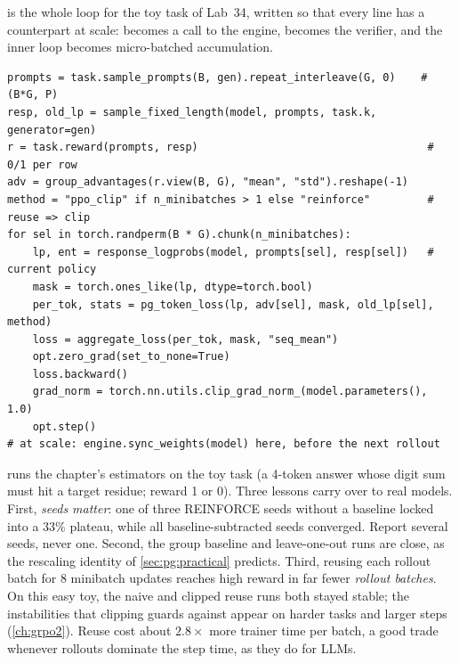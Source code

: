  is the whole loop for the toy task of Lab~34, written so that every line
has a counterpart at scale:  becomes a call to the engine,
 becomes the verifier, and the inner loop becomes micro-batched
accumulation.

\begin{lstlisting}[caption={One on-policy step with optional off-policy reuse (abridged from \code{llmsys.pg.train\_toy}).},label={lst:pg:step}]
prompts = task.sample_prompts(B, gen).repeat_interleave(G, 0)    # (B*G, P)
resp, old_lp = sample_fixed_length(model, prompts, task.k, generator=gen)
r = task.reward(prompts, resp)                                    # 0/1 per row
adv = group_advantages(r.view(B, G), "mean", "std").reshape(-1)
method = "ppo_clip" if n_minibatches > 1 else "reinforce"         # reuse => clip
for sel in torch.randperm(B * G).chunk(n_minibatches):
    lp, ent = response_logprobs(model, prompts[sel], resp[sel])   # current policy
    mask = torch.ones_like(lp, dtype=torch.bool)
    per_tok, stats = pg_token_loss(lp, adv[sel], mask, old_lp[sel], method)
    loss = aggregate_loss(per_tok, mask, "seq_mean")
    opt.zero_grad(set_to_none=True)
    loss.backward()
    grad_norm = torch.nn.utils.clip_grad_norm_(model.parameters(), 1.0)
    opt.step()
# at scale: engine.sync_weights(model) here, before the next rollout
\end{lstlisting}

 runs the chapter's estimators on the toy task (a 4-token answer whose
digit sum must hit a target residue; reward 1 or 0). Three lessons carry over to real
models. First, \emph{seeds matter}: one of three REINFORCE seeds without a baseline locked
into a 33\% plateau, while all baseline-subtracted seeds converged. Report several seeds,
never one. Second, the group baseline and leave-one-out runs are close, as the rescaling
identity of \cref{sec:pg:practical} predicts. Third, reusing each rollout batch for 8
minibatch updates reaches high reward in far fewer \emph{rollout batches}. On this easy
toy, the naive and clipped reuse runs both stayed stable; the instabilities that clipping
guards against appear on harder tasks and larger steps (\cref{ch:grpo2}). Reuse cost about
$2.8\times$ more trainer time per batch, a good trade whenever rollouts dominate the step
time, as they do for LLMs.

